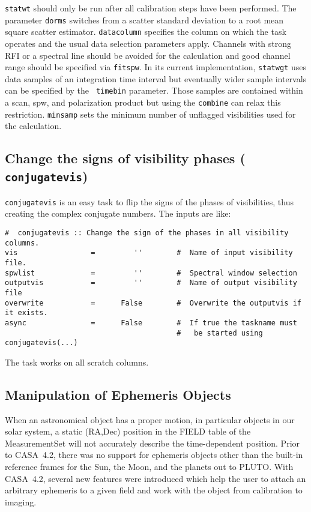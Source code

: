 {\tt statwt} should only be run after all calibration steps have been
performed. The parameter {\tt dorms} switches from a scatter standard
deviation to a root mean square scatter estimator. {\tt datacolumn}
specifies the column on which the task operates and the usual data
selection parameters apply. Channels with strong RFI or a spectral
line should be avoided for the calculation and good channel range
should be specified via {\tt fitspw}. In its current implementation,
{\tt statwgt} uses data samples of an integration time interval but
eventually wider sample intervals can be specified by the {\tt
  timebin} parameter. Those samples are contained within a scan, spw,
and polarization product but using the {\tt combine} can relax this
restriction. {\tt minsamp} sets the minimum number of unflagged
visibilities used for the calculation.


\subsection{Change the signs of visibility phases ({\tt
    conjugatevis})}
\label{section:cal.other.conjugatevis}

{\tt conjugatevis} is an easy task to flip the signs of the phases of
visibilities, thus creating the complex conjugate numbers. The inputs
are like:

\small
\begin{verbatim} 
#  conjugatevis :: Change the sign of the phases in all visibility columns.
vis                 =         ''        #  Name of input visibility file.
spwlist             =         ''        #  Spectral window selection
outputvis           =         ''        #  Name of output visibility file
overwrite           =      False        #  Overwrite the outputvis if it exists.
async               =      False        #  If true the taskname must
                                        #   be started using conjugatevis(...)
\end{verbatim}
\normalsize

The task works on all scratch columns. 

\subsection{Manipulation of Ephemeris Objects}
\label{section:cal.eph.manip}

When an astronomical object has a proper motion, in particular objects
in our solar system, a static (RA,Dec) position in the FIELD table of
the MeasurementSet will not accurately describe the time-dependent
position. Prior to CASA~4.2, there was no support for ephemeris objects
other than the built-in reference frames for the Sun, the Moon, and the
planets out to PLUTO. With CASA~4.2, several new features were
introduced which help the user to attach an arbitrary ephemeris to a
given field and work with the object from calibration to imaging.

